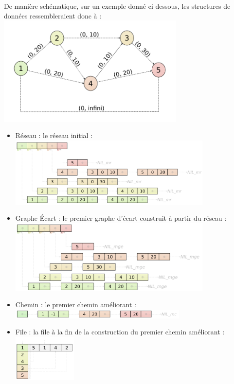 \documentclass[11pt, a4paper]{report}
\begin{document}
	De manière schématique, sur un exemple donné ci dessous, les structures de données ressembleraient donc à :\\
	\includegraphics[width=0.7\textwidth]{images/R3.png}\\
	\begin{itemize}
        \item Réseau : le réseau initial :\\
		\includegraphics[width=0.8\textwidth]{images/sch_reseau.png}\\
        \item Graphe Écart : le premier graphe d'écart construit à partir du réseau :\\
		\includegraphics[width=0.8\textwidth]{images/sch_graphe_ecart.png}\\
        \item Chemin : le premier chemin améliorant :\\
		\includegraphics[width=0.7\textwidth]{images/sch_chemin.png}\\
        \item File : la file à la fin de la construction du premier chemin améliorant :\\
		\includegraphics[width=0.25\textwidth]{images/sch_file.png}\\
	\end{itemize}
	
\end{document}
